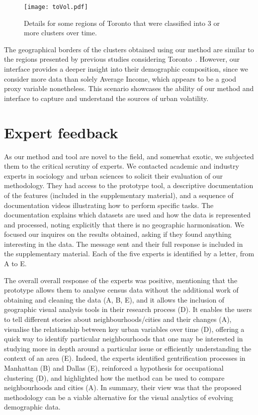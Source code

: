 \begin{figure}
    \centering 
    \texttt{[image: toVol.pdf]}
    \caption{Details for some regions of Toronto that were classified into 3 or
         more clusters over time.\label{fig:toVol}}
\end{figure}



The geographical borders of the clusters obtained using our method are similar
to the regions presented by previous studies considering
Toronto~\citep{hulchanski2007three}. However, our interface provides a deeper
insight into their demographic composition, since we consider more data than
solely Average Income, which appears to be a good proxy variable nonetheless.
This scenario showcases the ability of our method and interface to capture and
understand the sources of urban volatility.

\section{Expert feedback}
\label{sec:expert}
As our method and tool are novel to the field, and somewhat exotic,  we
subjected them to the critical scrutiny of experts. We contacted academic and
industry experts in sociology and urban sciences to solicit their evaluation of
our methodology. They had access to the prototype tool, a descriptive
documentation of the features (included in the supplementary material), and a
sequence of documentation videos illustrating how to perform specific tasks. The
documentation explains which datasets are used and how the data is represented
and processed, noting explicitly that there is no geographic harmonisation. We
focused our inquires on the results obtained, asking if they found anything
interesting in the data. The message sent and their full response is included in
the supplementary material. Each of the five experts is identified by a letter,
from A to E. 



The overall overall response of the experts was positive,  mentioning that the
prototype allows them to analyse census data without the additional work of
obtaining and cleaning the data (A, B, E), and it allows the inclusion of
geographic visual analysis tools in their research process (D). It enables the
users to tell different stories about neighbourhoods/cities and their changes
(A), visualise the relationship between key urban variables over time (D),
offering a quick way to identify particular neighbourhoods that one may be
interested in studying more in depth around a particular issue or efficiently
understanding the context of an area (E).  Indeed, the experts identified
gentrification processes in Manhattan (B) and Dallas (E), reinforced a
hypothesis for occupational clustering (D), and highlighted how the method can
be used to compare neighbourhoods and cities (A). In summary, their view was that
the proposed methodology can be a viable alternative for the visual analytics of
evolving demographic data.



